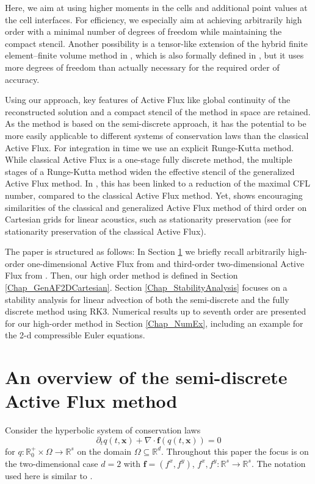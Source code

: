 \documentclass[12pt,a4paper]{article}
\begin{document}
Here, we aim at using higher moments in the cells and additional point values at the cell interfaces. For efficiency, we especially aim at achieving arbitrarily high order with a minimal number of degrees of freedom while maintaining the compact stencil. Another possibility is a tensor-like extension of the hybrid finite element--finite volume method in \cite{AB2023FEFV}, which is also formally defined in \cite{MthJK2024}, but it uses more degrees of freedom than actually necessary for the required order of accuracy.

Using our approach, key features of Active Flux like global continuity of the reconstructed solution and a compact stencil of the method in space are retained. As the method is based on the semi-discrete approach, it has the potential to be more easily applicable to different systems of conservation laws than the classical Active Flux. For integration in time we use an explicit Runge-Kutta method.
While classical Active Flux is a one-stage fully discrete method, the multiple stages of a Runge-Kutta method widen the effective stencil of the generalized Active Flux method. In \cite{Roe2021}, this has been linked to a reduction of the maximal CFL number, compared to the classical Active Flux method. Yet, \cite{BKKL2024pre} shows encouraging similarities of the classical and generalized Active Flux method of third order on Cartesian grids for linear acoustics, such as stationarity preservation (see \cite{BHKR2019} for stationarity preservation of the classical Active Flux).

The paper is structured as follows: In Section \ref{Chap_ReviewSemiDiscreteAF} we briefly recall arbitrarily high-order one-dimensional Active Flux from \cite{AB2023ExtensionAF,AB2023FEFV} and third-order two-dimensional Active Flux from \cite{ABK2025}. Then, our high order method is defined in Section \ref{Chap_GenAF2DCartesian}. Section \ref{Chap_StabilityAnalysis} focuses on a stability analysis for linear advection of both the semi-discrete and the fully discrete method using RK3. Numerical results up to seventh order are presented for our high-order method in Section \ref{Chap_NumEx}, including an example for the 2-d compressible Euler equations.






\section{An overview of the semi-discrete Active Flux method}
\label{Chap_ReviewSemiDiscreteAF}
Consider the hyperbolic system of conservation laws
\begin{equation}\label{Eq_SysCL}
\partial_t q(t, \mathbf x) + \nabla  \cdot \mathbf f(q(t,\mathbf x)) = 0
\end{equation}
for \(q\colon \mathbb R_0^+ \times \Omega \rightarrow \mathbb R^s\) on the domain \(\Omega \subseteq \mathbb R^d\). 
Throughout this paper the focus is on the two-dimensional case \(d=2\) with \(\mathbf f= (f^x, f^y)\), \(f^x, f^y\colon\mathbb R^s \rightarrow \mathbb R^s\). The notation used here is similar to \cite{ABK2025}.
\end{document}
